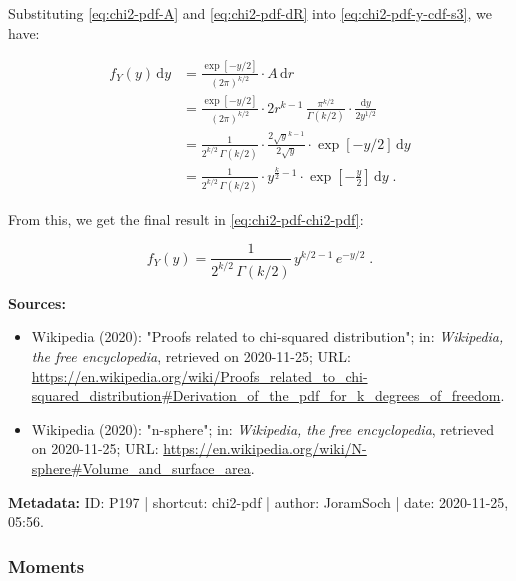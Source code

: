 \documentclass[a4paper,12pt,twoside]{book}
\begin{document}
Substituting \eqref{eq:chi2-pdf-A} and \eqref{eq:chi2-pdf-dR} into \eqref{eq:chi2-pdf-y-cdf-s3}, we have:

\begin{equation} \label{eq:chi2-pdf-y-cdf-s4}
\begin{split}
f_Y(y) \, \mathrm{d}y &= \frac{\exp \left[ -y/2 \right]}{(2 \pi)^{k/2}} \cdot A \, \mathrm{d}r \\
&= \frac{\exp \left[ -y/2 \right]}{(2 \pi)^{k/2}} \cdot 2 r^{k-1} \, \frac{\pi^{k/2}}{\Gamma(k/2)} \cdot \frac{\mathrm{d}y}{2 y^{1/2}} \\
&= \frac{1}{2^{k/2} \, \Gamma(k/2)} \cdot \frac{2 \sqrt{y}^{k-1}}{2 \sqrt{y}} \cdot \exp \left[ -y/2 \right] \, \mathrm{d}y \\
&= \frac{1}{2^{k/2} \, \Gamma(k/2)} \cdot y^{\frac{k}{2}-1} \cdot \exp \left[ -\frac{y}{2} \right] \, \mathrm{d}y \; .
\end{split}
\end{equation}

From this, we get the final result in \eqref{eq:chi2-pdf-chi2-pdf}:

\begin{equation} \label{eq:chi2-pdf-y-cdf-s5}
f_Y(y) = \frac{1}{2^{k/2} \, \Gamma (k/2)} \, y^{k/2-1} \, e^{-y/2} \; .
\end{equation}



\vspace{1em}
\textbf{Sources:}
\begin{itemize}
\item Wikipedia (2020): "Proofs related to chi-squared distribution"; in: \textit{Wikipedia, the free encyclopedia}, retrieved on 2020-11-25; URL: \url{https://en.wikipedia.org/wiki/Proofs_related_to_chi-squared_distribution#Derivation_of_the_pdf_for_k_degrees_of_freedom}.
\item Wikipedia (2020): "n-sphere"; in: \textit{Wikipedia, the free encyclopedia}, retrieved on 2020-11-25; URL: \url{https://en.wikipedia.org/wiki/N-sphere#Volume_and_surface_area}.
\end{itemize}


\vspace{1em}
\textbf{Metadata:} ID: P197 | shortcut: chi2-pdf | author: JoramSoch | date: 2020-11-25, 05:56.
\vspace{1em}



\subsubsection[\textbf{Moments}]{Moments} \label{sec:chi2-mom}
\setcounter{equation}{0}
\end{document}
